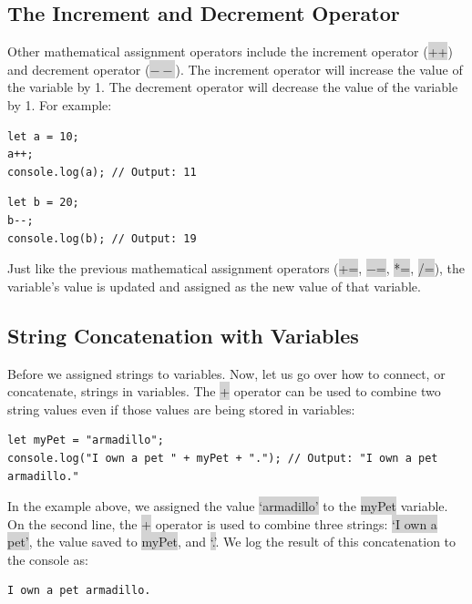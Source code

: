 \documentclass[11pt]{article}
\begin{document}
\subsection{The Increment and Decrement Operator}
Other mathematical assignment operators include the increment operator (\colorbox{lightgray}{++}) and decrement operator (\colorbox{lightgray}{$--$}). The increment operator will increase the value of the variable by 1. The decrement operator will decrease the value of the variable by 1. For example:
\begin{lstlisting}
let a = 10;
a++;
console.log(a); // Output: 11
\end{lstlisting}
\begin{lstlisting}
let b = 20;
b--;
console.log(b); // Output: 19
\end{lstlisting}
Just like the previous mathematical assignment operators (\colorbox{lightgray}{+=}, \colorbox{lightgray}{$-$=}, \colorbox{lightgray}{*=}, \colorbox{lightgray}{/=}), the variable’s value is updated and assigned as the new value of that variable.

\subsection{String Concatenation with Variables}
Before we assigned strings to variables. Now, let us go over how to connect, or concatenate, strings in variables. The \colorbox{lightgray}{+} operator can be used to combine two string values even if those values are being stored in variables:
\begin{lstlisting}
let myPet = "armadillo";
console.log("I own a pet " + myPet + "."); // Output: "I own a pet armadillo."
\end{lstlisting}
In the example above, we assigned the value \colorbox{lightgray}{`armadillo'} to the \colorbox{lightgray}{myPet} variable. On the second line, the \colorbox{lightgray}{+} operator is used to combine three strings: \colorbox{lightgray}{`I own a pet'}, the value saved to \colorbox{lightgray}{myPet}, and \colorbox{lightgray}{`.'}. We log the result of this concatenation to the console as:
\begin{lstlisting}
I own a pet armadillo.
\end{lstlisting}
\end{document}
